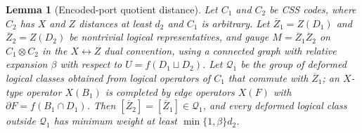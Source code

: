 \documentclass[aps,prx,reprint,superscriptaddress,nofootinbib,floatfix,longbibliography]{revtex4-2}
\newtheorem{lemma}[theorem]{Lemma}
\theoremstyle{definition}
\begin{document}
\begin{lemma}[Encoded-port quotient distance]
\label{lem:encoded-port-quotient}
Let $C_1$ and $C_2$ be CSS codes, where $C_2$ has $X$ and $Z$ distances at
least $d_2$ and $C_1$ is arbitrary.  Let $\overline Z_1=Z(D_1)$ and
$\overline Z_2=Z(D_2)$ be nontrivial logical representatives, and gauge
$M=\overline Z_1\overline Z_2$ on $C_1\otimes C_2$ in the $X\leftrightarrow Z$
dual convention, using a connected graph with relative expansion $\beta$ with
respect to $U=f(D_1\sqcup D_2)$.  Let $\mathcal Q_1$ be the group of deformed
logical classes obtained from logical operators of $C_1$ that commute with
$\overline Z_1$; an $X$-type operator $X(B_1)$ is completed by edge operators
$X(F)$ with $\partial F=f(B_1\cap D_1)$.  Then
$[\overline Z_2]=[\overline Z_1]\in\mathcal Q_1$, and every deformed logical
class outside $\mathcal Q_1$ has minimum weight at least $\min\{1,\beta\}d_2$.
\end{lemma}
\end{document}

